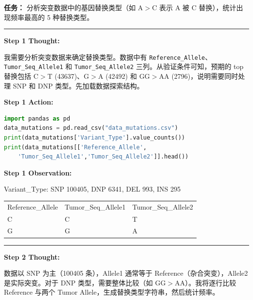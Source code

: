 \begin{mdframed}[linewidth=0.8pt, roundcorner=5pt, backgroundcolor=gray!5,
  innertopmargin=8pt, innerbottommargin=8pt,
  skipabove=10pt, skipbelow=10pt]

\textbf{任务：} 分析突变数据中的基因替换类型（如 A$>$C 表示 A 被 C 替换），统计出现频率最高的 5 种替换类型。

\vspace{4pt}
\hrule
\vspace{6pt}

\textbf{Step 1 \quad Thought:}

{\small 我需要分析突变数据来确定替换类型。数据中有 \texttt{Reference\_Allele}、\texttt{Tumor\_Seq\_Allele1} 和 \texttt{Tumor\_Seq\_Allele2} 三列。从验证条件可知，预期的 top 替换包括 C$>$T (43637)、G$>$A (42492) 和 GG$>$AA (2796)，说明需要同时处理 SNP 和 DNP 类型。先加载数据探索结构。}

\vspace{4pt}
\textbf{Step 1 \quad Action:}
\begin{lstlisting}[language=Python, basicstyle=\scriptsize\ttfamily,
  numbers=none, xleftmargin=4pt, framexleftmargin=0pt,
  breaklines=true, breakatwhitespace=true, frame=none,
  backgroundcolor={}]
import pandas as pd
data_mutations = pd.read_csv("data_mutations.csv")
print(data_mutations['Variant_Type'].value_counts())
print(data_mutations[['Reference_Allele',
    'Tumor_Seq_Allele1','Tumor_Seq_Allele2']].head())
\end{lstlisting}

\vspace{2pt}
\textbf{Step 1 \quad Observation:}

{\small\ttfamily
Variant\_Type: SNP 100405, DNP 6341, DEL 993, INS 295 \\
\begin{tabular}{lll}
Reference\_Allele & Tumor\_Seq\_Allele1 & Tumor\_Seq\_Allele2 \\
C & C & T \\
G & G & A \\
\end{tabular}
}

\vspace{4pt}
\hrule
\vspace{6pt}

\textbf{Step 2 \quad Thought:}

{\small 数据以 SNP 为主（100405 条），Allele1 通常等于 Reference（杂合突变），Allele2 是实际突变。对于 DNP 类型，需要整体比较（如 GG$>$AA）。我将逐行比较 Reference 与两个 Tumor Allele，生成替换类型字符串，然后统计频率。}


\end{mdframed}
